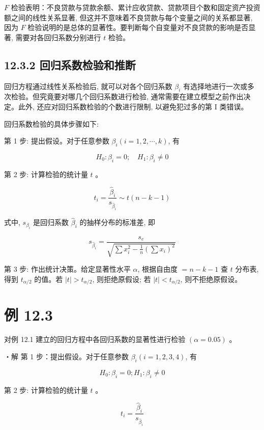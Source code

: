 \documentclass[10pt]{article}
\begin{document}
\begin{CJK*}{UTF8}{bsmi}
$F$ 检验表明：不良贷款与贷款余额、累计应收贷款、贷款项目个数和固定资产投资额之间的线性关系显著, 但这并不意味着不良贷款与每个变量之间的关系都显著, 因为 $F$ 检验说明的是总体的显著性。要判断每个自变量对不良贷款的影响是否显著, 需要对各回归系数分别进行 $t$ 检验。

\subsection*{12.3.2 回归系数检验和推断}
回归方程通过线性关系检验后, 就可以对各个回归系数 $\beta_{i}$ 有选择地进行一次或多次检验。但究竟要对哪几个回归系数进行检验, 通常需要在建立模型之前作出决定。此外, 还应对回归系数检验的个数进行限制, 以避免犯过多的第 I 类错误。

回归系数检验的具体步骤如下:

第 1 步: 提出假设。对于任意参数 $\beta_{i}(i=1,2, \cdots, k)$, 有

$$
H_{0}: \beta_{i}=0 ; \quad H_{1}: \beta_{i} \neq 0
$$

第 2 步: 计算检验的统计量 $t$ 。


\begin{equation*}
t_{i}=\frac{\hat{\beta}_{i}}{s_{\hat{\beta}_{i}}} \sim t(n-k-1) \tag{12.11}
\end{equation*}


式中, $s_{\beta_{i}}$ 是回归系数 $\hat{\beta}_{i}$ 的抽样分布的标准差, 即


\begin{equation*}
s_{\hat{\beta}_{i}}=\frac{s_{e}}{\sqrt{\sum x_{i}^{2}-\frac{1}{n}\left(\sum x_{i}\right)^{2}}} \tag{12.12}
\end{equation*}


第 3 步: 作出统计决策。给定显著性水平 $\alpha$, 根据自由度 $=n-k-1$ 查 $t$ 分布表, 得到 $t_{\alpha / 2}$ 的值。若 $|t|>t_{\alpha / 2}$, 则拒绝原假设; 若 $|t|<t_{\alpha / 2}$, 则不拒绝原假设。

\section*{例 12.3}
对例 12.1 建立的回归方程中各回归系数的显著性进行检验 $(\alpha=0.05)$ 。

・解 第 1 步：提出假设。对于任意参数 $\beta_{i}(i=1,2,3,4)$, 有

$$
H_{0}: \beta_{i}=0 ; H_{1}: \beta_{i} \neq 0
$$

第 2 步: 计算检验的统计量 $t$ 。


\begin{equation*}
t_{i}=\frac{\hat{\beta}_{i}}{s_{\hat{\beta}_{i}}} \tag{12.13}
\end{equation*}



\end{CJK*}
\end{document}
